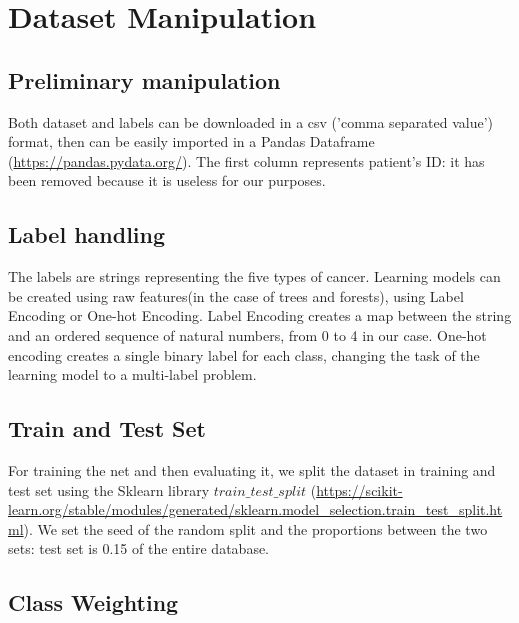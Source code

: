 \documentclass[%
 reprint,
 amsmath,amssymb,
 aps,
]{revtex4-1}
\begin{document}

\section{\label{sec:level1}Dataset Manipulation}


\subsection{\label{sec:level2}Preliminary manipulation}
Both dataset and labels can be downloaded in a csv ('comma separated value') format, then can be easily imported in a Pandas Dataframe (\url{https://pandas.pydata.org/}). The first column represents patient's ID: it has been removed because it is useless for our purposes.



\subsection{\label{sec:level2}Label handling}
The labels are strings representing the five types of cancer. Learning models can be created using raw features(in the case of trees and forests), using Label Encoding or One-hot Encoding.
Label Encoding creates a map between the string and an ordered sequence of natural numbers, from 0 to 4 in our case.
One-hot encoding creates a single binary label for each class, changing the task of the learning model to a multi-label problem.



\subsection{\label{sec:level2}Train and Test Set}

For training the net and then evaluating it, we split the dataset in training and test set using the Sklearn library $train\_test\_split$ (\url{https://scikit-learn.org/stable/modules/generated/sklearn.model_selection.train_test_split.html}). We set the seed of the random split and the proportions between the two sets: test set is 0.15 of the entire database.

\subsection{\label{sec:level2}Class Weighting}


\end{document}
